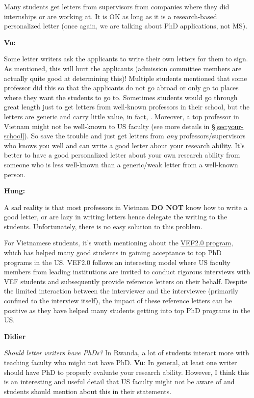 \documentclass[11pt]{article}
\newenvironment{commentbox}[1][]{
\small
    \begin{cbox}
    \textbf{#1} 
 }{
   \end{cbox}
}
\newcommand{\red}[1]{{\color{red}{#1}}}
\begin{document}
Many students get letters from supervisors from companies where they did internships or are working at. It is OK as long as it is a research-based personalized letter (once again, we are talking about PhD applications, not MS).

\begin{commentbox}[Vu:]
Some letter writers ask the applicants to write their own letters for them to sign. As mentioned, this will hurt the applicants (admission committee members are actually quite good at determining this)! Multiple students mentioned that  some professor did this so that the applicants do not go abroad or only go to places where they want the students to go to.
\tcblower
Sometimes students would go through great length just to get letters from well-known professors in their school, but the letters are generic and carry little value, in fact, \red{red flags}. Moreover, a top professor in Vietnam might not be well-known to US faculty (see more details in \S\ref{sec:your-school}). So save the trouble and just get letters from \emph{any} professors/supervisors who knows you well and can write a good letter about your research ability. It's better to have a good personalized
letter about your own research ability from someone who is less
well-known than a generic/weak letter from a well-known person.
\end{commentbox}

\begin{commentbox}[Hung:]
A sad reality is that most professors in Vietnam \textbf{DO NOT} know how to write a good letter, or are lazy in writing letters hence delegate the writing to the students. Unfortunately, there is no easy solution to this problem.
\end{commentbox}

For Vietnamese students, it's worth mentioning about the \href{https://vef2.org/}{VEF2.0 program}, which has helped many good students in gaining acceptance to top PhD programs in the US. VEF2.0 follows an interesting model where US faculty members from leading institutions are invited to conduct rigorous interviews with VEF students and subsequently provide reference letters on their behalf. Despite the limited interaction between the interviewer and the interviewee (primarily confined to the interview itself), the impact of these reference letters can be positive as they have helped many students getting into top PhD programs in the US.

\begin{commentbox}[Didier]
\emph{Should letter writers have PhDs?}  In Rwanda, a lot of students interact more with teaching faculty who might not have PhD.
\tcblower
\textbf{Vu}: In general, at least one writer should have PhD to properly evaluate your research ability.  However, I think this is an interesting and useful detail that US faculty might not be aware of and students should mention about this in their statements.
\end{commentbox}
\end{document}
